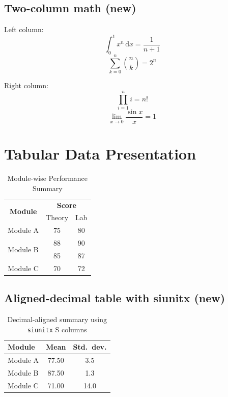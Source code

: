 \documentclass[11pt,a4paper]{article}
\theoremstyle{plain}
\theoremstyle{definition}
\theoremstyle{remark}
\begin{document}
\subsection{Two-column math (new)}
\begin{multicols}{2}
\noindent
Left column:
\[
\int_0^1 x^n \, \mathrm{d}x = \frac{1}{n+1}
\]
\[
\sum_{k=0}^{n} \binom{n}{k} = 2^n
\]

\columnbreak

\noindent
Right column:
\[
\prod_{i=1}^{n} i = n!
\]
\[
\lim_{x \to 0} \frac{\sin x}{x} = 1
\]
\end{multicols}

\section{Tabular Data Presentation}

\begin{table}[!h]
    \centering
    \begin{tabular}{|c|c|c|}
    \hline
        \multirow{2}{2cm}{\centering \textbf{Module}} & \multicolumn{2}{|c|}{\textbf{Score}} \\ \cline{2-3}
          & Theory & Lab  \\ \hline
          Module A & 75 & 80 \\ \hline
          \multirow{2}{2cm}{\centering Module B} & 88 & 90 \\
          & 85 & 87 \\ \hline
          Module C & 70 & 72 \\ \hline
    \end{tabular}
    \caption{Module-wise Performance Summary}
    \label{tab:modules}
\end{table}

\subsection{Aligned-decimal table with siunitx (new)}
\begin{table}[H]
\centering
{}
\begin{tabular}{l S[table-format=3.2] S[table-format=2.1]}
\toprule
{\textbf{Module}} & {\textbf{Mean}} & {\textbf{Std.\ dev.}} \\
\midrule
Module A & 77.50 & 3.5 \\
Module B & 87.50 & 1.3 \\
Module C & 71.00 & 14.0 \\
\bottomrule
\end{tabular}
\caption{Decimal-aligned summary using \texttt{siunitx} S columns}
\label{tab:siunitx}
\end{table}
\end{document}
